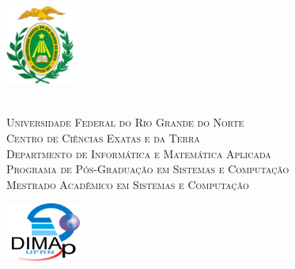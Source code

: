 
\begin{titlepage}
	\begin{center}
		
		\begin{minipage}{2.3cm}
			\begin{center}
				\includegraphics[width=2.25cm, height=2.68cm]{Imagens/Brasao-UFRN.jpg}
			\end{center}
		\end{minipage}
		\begin{minipage}{11.15cm}
			\begin{center}
				\begin{espacosimples}
					{\small \ \\
                       \textsc{Universidade Federal do Rio Grande do Norte}		   			\\
							  \textsc{Centro de Ciências Exatas e da Terra}					\\
							  \textsc{Departmento de Informática e Matemática Aplicada}	   	\\
							  \textsc{Programa de Pós-Graduação em Sistemas e Computação}  	\\
                       \textsc{Mestrado Acadêmico em Sistemas e Computação}}   				\\
				\end{espacosimples}
			\end{center}
		\end{minipage}
		\begin{minipage}{2.3cm}
			\begin{center}
				\includegraphics[width=2.52cm, height=1.96cm]{Imagens/Logotipo-DIMAp.png}
			\end{center}
		\end{minipage}
			

\end{center}
\end{titlepage}
